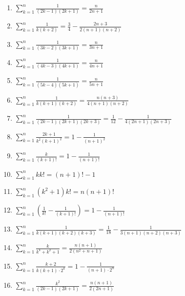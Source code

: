 \documentclass[11pt,a4paper]{article}
\begin{document}
\begin{enumerate}
\item $\displaystyle \sum_{k=1}^{n} \frac{1}{\left(2k - 1\right)\left(2k + 1\right)} = \frac{n}{2n + 1}$
\item $\displaystyle \sum_{k=1}^{n} \frac{1}{k\left(k + 2\right)} = \frac{3}{4} - \frac{2n + 3}{2\left(n + 1\right)\left(n + 2\right)}$
\item $\displaystyle \sum_{k=1}^{n} \frac{1}{\left(3k - 2\right)\left(3k + 1\right)} = \frac{n}{3n + 1}$
\item $\displaystyle \sum_{k=1}^{n} \frac{1}{\left(4k - 3\right)\left(4k + 1\right)} = \frac{n}{4n + 1}$
\item $\displaystyle \sum_{k=1}^{n} \frac{1}{\left(5k - 4\right)\left(5k + 1\right)} = \frac{n}{5n + 1}$
\item $\displaystyle \sum_{k=1}^{n} \frac{1}{k\left(k + 1\right)\left(k + 2\right)} = \frac{n\left(n + 3\right)}{4\left(n + 1\right)\left(n + 2\right)}$
\item $\displaystyle \sum_{k=1}^{n} \frac{1}{\left(2k - 1\right)\left(2k + 1\right)\left(2k + 3\right)} = \frac{1}{12} - \frac{1}{4\left(2n + 1\right)\left(2n + 3\right)}$
\item $\displaystyle \sum_{k=1}^{n} \frac{2k + 1}{k^{2}\left(k + 1\right)^{2}} = 1 - \frac{1}{\left(n + 1\right)^{2}}$
\item $\displaystyle \sum_{k=1}^{n} \frac{k}{\left(k + 1\right)!} = 1 - \frac{1}{\left(n + 1\right)!}$
\item $\displaystyle \sum_{k=1}^{n} k k! = \left(n + 1\right)! - 1$
\item $\displaystyle \sum_{k=1}^{n} \left(k^{2} + 1\right)k! = n\left(n + 1\right)!$
\item $\displaystyle \sum_{k=1}^{n} \left(\frac{1}{k!} - \frac{1}{\left(k + 1\right)!}\right) = 1 - \frac{1}{\left(n + 1\right)!}$
\item $\displaystyle \sum_{k=1}^{n} \frac{1}{k\left(k + 1\right)\left(k + 2\right)\left(k + 3\right)} = \frac{1}{18} - \frac{1}{3\left(n + 1\right)\left(n + 2\right)\left(n + 3\right)}$
\item $\displaystyle \sum_{k=1}^{n} \frac{k}{k^{4} + k^{2} + 1} = \frac{n\left(n + 1\right)}{2\left(n^{2} + n + 1\right)}$
\item $\displaystyle \sum_{k=1}^{n} \frac{k + 2}{k\left(k + 1\right) \cdot 2^{k}} = 1 - \frac{1}{\left(n + 1\right) \cdot 2^{n}}$
\item $\displaystyle \sum_{k=1}^{n} \frac{k^{2}}{\left(2k - 1\right)\left(2k + 1\right)} = \frac{n\left(n + 1\right)}{2\left(2n + 1\right)}$

\end{enumerate}
\end{document}
